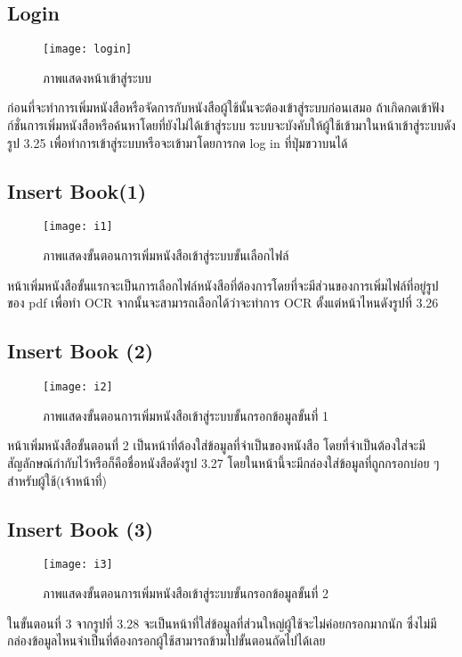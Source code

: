 \subsection{Login}
\begin{figure}[H]
    \centering
    \texttt{[image: login]}
    \caption{ภาพแสดงหน้าเข้าสู่ระบบ}\label{fig:scene7}
\end{figure}
ก่อนที่จะทำการเพิ่มหนังสือหรือจัดการกับหนังสือผู้ใช้นั้นจะต้องเข้าสู่ระบบก่อนเสมอ ถ้าเกิดกดเข้าฟังก์ชั่นการเพิ่มหนังสือหรือค้นหาโดยที่ยังไม่ได้เข้าสู่ระบบ ระบบจะบังคับให้ผู้ใช้เข้ามาในหน้าเข้าสู่ระบบดังรูป 3.25 เพื่อทำการเข้าสู่ระบบหรือจะเข้ามาโดยการกด log in ที่ปุ่มขวาบนได้

\subsection{Insert Book(1)}
\begin{figure}[H]
    \centering
    \texttt{[image: i1]}
    \caption{ภาพแสดงขั้นตอนการเพิ่มหนังสือเข้าสู่ระบบขั้นเลือกไฟล์}\label{fig:i1}
\end{figure}
หน้าเพิ่มหนังสือขั้นแรกจะเป็นการเลือกไฟล์หนังสือที่ต้องการโดยที่จะมีส่วนของการเพิ่มไฟล์ที่อยู่รูปของ pdf เพื่อทำ OCR จากนั้นจะสามารถเลือกได้ว่าจะทำการ OCR ตั้งแต่หน้าไหนดังรูปที่ 3.26

\subsection{Insert Book (2) }
\begin{figure}[H]
    \centering
    \texttt{[image: i2]}
    \caption{ภาพแสดงขั้นตอนการเพิ่มหนังสือเข้าสู่ระบบขั้นกรอกข้อมูลขั้นที่ 1}\label{fig:i2}
\end{figure}
หน้าเพิ่มหนังสือขั้นตอนที่ 2 เป็นหน้าที่ต้องใส่ข้อมูลที่จำเป็นของหนังสือ โดยที่จำเป็นต้องใส่จะมีสัญลักษณ์กำกับไว้หรือก็คือชื่อหนังสือดังรูป 3.27 โดยในหน้านี้จะมีกล่องใส่ข้อมูลที่ถูกกรอกบ่อย ๆสำหรับผู้ใช้(เจ้าหน้าที่)

\subsection{Insert Book (3)}
\begin{figure}[H]
    \centering
    \texttt{[image: i3]}
    \caption{ภาพแสดงขั้นตอนการเพิ่มหนังสือเข้าสู่ระบบขั้นกรอกข้อมูลขั้นที่ 2}\label{fig:i3}
\end{figure}
ในขั้นตอนที่ 3 จากรูปที่ 3.28 จะเป็นหน้าที่ใส่ข้อมูลที่ส่วนใหญ่ผู้ใช้จะไม่ค่อยกรอกมากนัก ซึ่งไม่มีกล่องข้อมูลไหนจำเป็นที่ต้องกรอกผู้ใช้สามารถข้ามไปขั้นตอนถัดไปได้เลย

